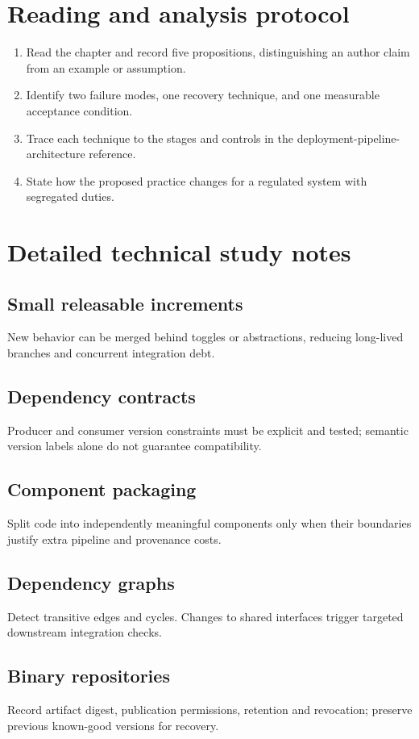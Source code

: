 \documentclass[10pt,letterpaper]{article}
\begin{document}
\section{Reading and analysis protocol}
\begin{enumerate}
\item Read the chapter and record five propositions, distinguishing an author claim from an example or assumption.
\item Identify two failure modes, one recovery technique, and one measurable acceptance condition.
\item Trace each technique to the stages and controls in the deployment-pipeline-architecture reference.
\item State how the proposed practice changes for a regulated system with segregated duties.
\end{enumerate}

\section{Detailed technical study notes}
\subsection{Small releasable increments}
New behavior can be merged behind toggles or abstractions, reducing long-lived branches and concurrent integration debt.

\subsection{Dependency contracts}
Producer and consumer version constraints must be explicit and tested; semantic version labels alone do not guarantee compatibility.

\subsection{Component packaging}
Split code into independently meaningful components only when their boundaries justify extra pipeline and provenance costs.

\subsection{Dependency graphs}
Detect transitive edges and cycles. Changes to shared interfaces trigger targeted downstream integration checks.

\subsection{Binary repositories}
Record artifact digest, publication permissions, retention and revocation; preserve previous known-good versions for recovery.
\end{document}
